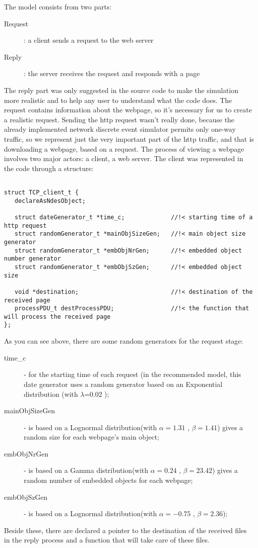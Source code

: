  The model consists from two parts:
  \begin{description}
    \item[Request]: a client sends a request to the web server  
    \item[Reply]: the server receives the request and responds with a page
  \end{description}
  The reply part was only suggested in the source code to make the simulation more realistic and to help any user to understand what the code does. 
The request contains information about the webpage, so it's necessary for us to create a realistic request. Sending the http request wasn't really done, 
because the already implemented network discrete event simulator permits only one-way traffic, so we represent just the very important part of the http 
traffic, and that is downloading a webpage, based on a request.
  The process of viewing a webpage involves two major actors: a client, a web server.
  The client was represented in the code through a structure:
\begin{verbatim}

struct TCP_client_t {
   declareAsNdesObject;

   struct dateGenerator_t *time_c;             //!< starting time of a http request 
   struct randomGenerator_t *mainObjSizeGen;   //!< main object size generator
   struct randomGenerator_t *embObjNrGen;      //!< embedded object number generator
   struct randomGenerator_t *embObjSzGen;      //!< embedded object size

   void *destination;                          //!< destination of the received page
   processPDU_t destProcessPDU;                //!< the function that will process the received page
};
\end{verbatim}
 As you can see above, there are some random generators for the request stage:
 \begin{description}
 \item[time\_c] - for the starting time of each request (in the recommended model, 
this date generator uses a random generator based on an Exponential distribution (with $\lambda$=0.02 );
 \item[mainObjSizeGen] - is based on a Lognormal distribution(with $\alpha=1.31$ , $\beta=1.41$) gives a random size for each webpage's main object;
 \item[embObjNrGen] - is based on a Gamma distribution(with $\alpha=0.24$ , $\beta=23.42$) gives a random number of embedded objects for each webpage;
 \item[embObjSzGen] - is based on a Lognormal distribution(with $\alpha=-0.75$ , $\beta=2.36$);
 \end{description}
   Beside these, there are declared a pointer to the destination of the received files in the reply process and a function that will take care of these files.
 
